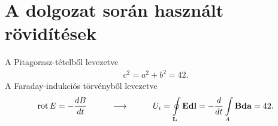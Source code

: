 \clearpage\section{A dolgozat során használt rövidítések}
A Pitagorasz-tételből levezetve
\begin{align}
c^2=a^2+b^2=42.
\end{align}
A Faraday-indukciós törvényből levezetve
\begin{align}
\operatorname{rot} E=-\frac{dB}{dt}\hspace{1cm}\longrightarrow \hspace{1cm}
U_i=\oint\limits_\mathbf{L}{\mathbf{E}\mathbf{dl}}=-\frac{d}{dt}\int\limits_A{\mathbf{B}\mathbf{da}}=42.
\end{align}
